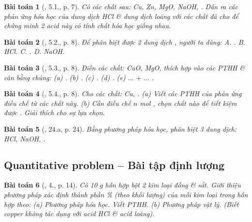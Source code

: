 \documentclass{article}
\newtheorem{baitoan}{Bài toán}
\begin{document}
\begin{baitoan}[\cite{SBT_Hoa_Hoc_9}, 5.1., p. 7]
	Có các chất sau: \emph{Cu, Zn, MgO, NaOH, }. Dẫn ra các phản ứng hóa học của dung dịch \emph{HCl} \& dung dịch \emph{} loãng với các chất đã cho để chứng minh 2 acid này có tính chất hóa học giống nhau.
\end{baitoan}

\begin{baitoan}[\cite{SBT_Hoa_Hoc_9}, 5.2., p. 8]
	Để phân biệt được 2 dung dịch \emph{}, người ta dùng: {\sf A.} \emph{}. {\sf B.} \emph{HCl}. {\sf C.} \emph{}. {\sf D.} \emph{NaOH}.
\end{baitoan}

\begin{baitoan}[\cite{SBT_Hoa_Hoc_9}, 5.3., p. 8]
	Điền các chất: \emph{CuO, MgO, } thích hợp vào các PTHH \& cân bằng chúng: (a) \emph{}. (b) \emph{}. (c) \emph{}. (d) \emph{}. (e) $\ldots$ $+$ $\ldots$ \emph{}.
\end{baitoan}

\begin{baitoan}[\cite{SBT_Hoa_Hoc_9}, 5.4., p. 8]
	Cho các chất: \emph{Cu, }. (a) Viết các PTHH của phản ứng điều chế \emph{} từ các chất này. (b) Cần điều chế $n$ \emph{mol }, chọn chất nào để tiết kiệm được \emph{}. Giải thích cho sự lựa chọn.
\end{baitoan}

\begin{baitoan}[\cite{An_350_BT_Hoa_Hoc_9}, 24.a, p. 24]
	Bằng phương pháp hóa học, phân biệt 3 dung dịch: \emph{HCl, NaOH, }.
\end{baitoan}

\subsection{Quantitative problem -- Bài tập định lượng}

\begin{baitoan}[\cite{SGK_Hoa_Hoc_9}, 4., p. 14]
	Có \emph{10 g} hỗn hợp bột 2 kim loại đồng \& sắt. Giới thiệu phương pháp xác định thành phần \% (theo khối lượng) của mỗi kim loại trong hỗn hợp theo: (a) Phương pháp hóa học. Viết PTHH. (b) Phương pháp vật lý. (Biết copper không tác dụng với acid \emph{HCl} \& acid \emph{} loãng).
\end{baitoan}
\end{document}
